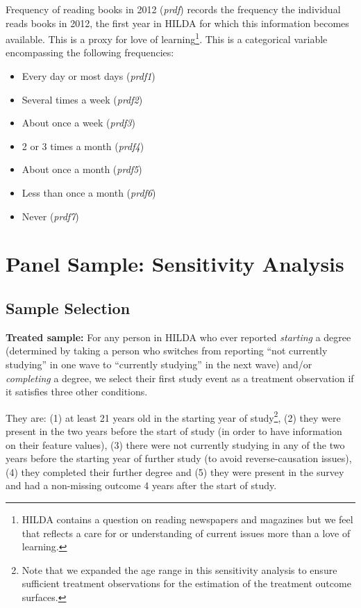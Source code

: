 \documentclass[12pt, a4paper]{article}
\begin{document}
Frequency of reading books in 2012 (\textit{p\textunderscore{}rdf}) records the frequency the individual reads books in 2012, the first year in HILDA for which this information becomes available. This is a proxy for love of learning\footnote{HILDA contains a question on reading newspapers and magazines but we feel that reflects a care for or understanding of current issues more than a love of learning.}. This is a categorical variable encompassing the following frequencies:
\begin{itemize}
  \item Every day or most days (\textit{p\textunderscore{}rdf1}) 
  \item Several times a week (\textit{p\textunderscore{}rdf2}) 
  \item About once a week (\textit{p\textunderscore{}rdf3}) 
  \item 2 or 3 times a month (\textit{p\textunderscore{}rdf4}) 
  \item About once a month (\textit{p\textunderscore{}rdf5}) 
  \item Less than once a month (\textit{p\textunderscore{}rdf6}) 
  \item Never (\textit{p\textunderscore{}rdf7}) 
\end{itemize}

\clearpage

\section{Panel Sample: Sensitivity Analysis}
\label{app:sensitivity}

\subsection{Sample Selection}

\textbf{Treated sample:} For any person in HILDA who ever reported \textit{starting} a degree (determined by taking a person who switches from reporting “not currently studying” in one wave to “currently studying” in the next wave) and/or \textit{completing} a degree, we select their first study event as a treatment observation if it satisfies three other conditions.

They are: (1) at least 21 years old in the starting year of study\footnote{Note that we expanded the age range in this sensitivity analysis to ensure sufficient treatment observations for the estimation of the treatment outcome surfaces.}, (2) they were present in the two years before the start of study (in order to have information on their feature values), (3) there were not currently studying in any of the two years before the starting year of further study (to avoid reverse-causation issues), (4) they completed their further degree and (5) they were present in the survey and had a non-missing outcome 4 years after the start of study. 
\end{document}
